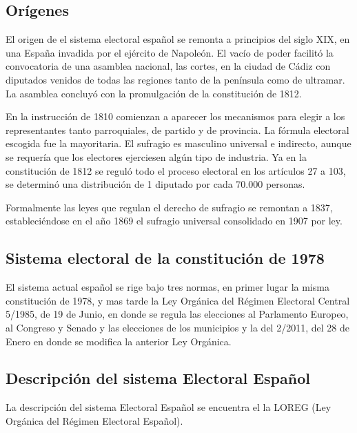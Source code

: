 \documentclass[12pt,a4paper,]{book}
\numberwithin{dummy}{section}
\theoremstyle{ocrenumbox}
\theoremstyle{blacknumex}
\theoremstyle{blacknumbox}
\theoremstyle{ocrenum}
\theoremstyle{ocrenum}
\begin{document}
\hypertarget{oruxedgenes}{%
\subsection{Orígenes}\label{oruxedgenes}}

El origen de el sistema electoral español se remonta a principios del
siglo XIX, en una España invadida por el ejército de Napoleón. El vacío
de poder facilitó la convocatoria de una asamblea nacional, las cortes,
en la ciudad de Cádiz con diputados venidos de todas las regiones tanto
de la península como de ultramar. La asamblea concluyó con la
promulgación de la constitución de 1812.

En la instrucción de 1810 comienzan a aparecer los mecanismos para
elegir a los representantes tanto parroquiales, de partido y de
provincia. La fórmula electoral escogida fue la mayoritaria. El sufragio
es masculino universal e indirecto, aunque se requería que los electores
ejerciesen algún tipo de industria. Ya en la constitución de 1812 se
reguló todo el proceso electoral en los artículos 27 a 103, se determinó
una distribución de 1 diputado por cada 70.000 personas.

Formalmente las leyes que regulan el derecho de sufragio se remontan a
1837, estableciéndose en el año 1869 el sufragio universal consolidado
en 1907 por ley.

\hypertarget{sistema-electoral-de-la-constituciuxf3n-de-1978}{%
\subsection{Sistema electoral de la constitución de
1978}\label{sistema-electoral-de-la-constituciuxf3n-de-1978}}

El sistema actual español se rige bajo tres normas, en primer lugar la
misma constitución de 1978, y mas tarde la Ley Orgánica del Régimen
Electoral Central 5/1985, de 19 de Junio, en donde se regula las
elecciones al Parlamento Europeo, al Congreso y Senado y las elecciones
de los municipios y la del 2/2011, del 28 de Enero en donde se modifica
la anterior Ley Orgánica.

\hypertarget{descripciuxf3n-del-sistema-electoral-espauxf1ol}{%
\subsection{Descripción del sistema Electoral
Español}\label{descripciuxf3n-del-sistema-electoral-espauxf1ol}}

La descripción del sistema Electoral Español se encuentra el la LOREG
(Ley Orgánica del Régimen Electoral Español).
\end{document}
